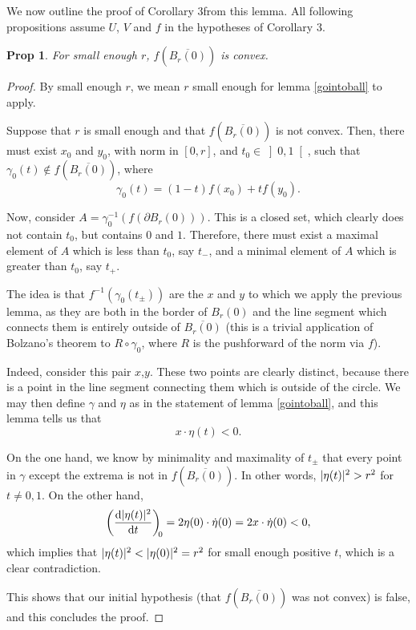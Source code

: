 \documentclass{article}
\newtheorem{prop}{Prop}
\theoremstyle{nonumberplain}
\newtheorem{proof}{Proof}
\DeclarePairedDelimiter{\norm}{\lvert}{\rvert}
\newcommand{\corthree}{Corollary 3}
\begin{document}
We now outline the proof of \corthree from this lemma. All following propositions assume $U$, $V$ and $f$ in the hypotheses of \corthree.

\begin{prop}
For small enough $r$, $f(\overline{B_r(0)})$ is convex.
\end{prop}

\begin{proof}
By small enough $r$, we mean $r$ small enough for lemma \ref{gointoball} to apply.

Suppose that $r$ is small enough and that $f(\overline{B_r(0)})$ is not convex. Then, there must exist $x_0$ and $y_0$, with norm in $[0,r]$, and $t_0 \in \left]0,1\right[$, such that $\gamma_0(t) \not \in f(\overline{B_r(0)})$, where
\[\gamma_0(t) = (1-t) f(x_0) + t f(y_0).\]

Now, consider $A = \gamma_0^{-1}(f(\partial B_r(0)))$. This is a closed set, which clearly does not contain $t_0$, but contains $0$ and $1$. Therefore, there must exist a maximal element of $A$ which is less than $t_0$, say $t_-$, and a minimal element of $A$ which is greater than $t_0$, say $t_+$.

The idea is that $f^{-1}(\gamma_0(t_\pm))$ are the $x$ and $y$ to which we apply the previous lemma, as they are both in the border of $B_r(0)$ and the line segment which connects them is entirely outside of $\overline{B_r(0)}$ (this is a trivial application of Bolzano's theorem to $R \circ \gamma_0$, where $R$ is the pushforward of the norm via $f$).

Indeed, consider this pair $x$,$y$. These two points are clearly distinct, because there is a point in the line segment connecting them which is outside of the circle. We may then define $\gamma$ and $\eta$ as in the statement of lemma \ref{gointoball}, and this lemma tells us that
\[x \cdot \eta(t) < 0.\]

On the one hand, we know by minimality and maximality of $t_\pm$ that every point in $\gamma$ except the extrema is not in $f(\overline{B_r(0)})$. In other words, $\norm{\eta(t)}^2 > r^2$ for $t \neq 0, 1$. On the other hand,
\[\diff{\norm{\eta(t)}^2}t[0] = 2 \eta(0) \cdot \dot\eta(0) = 2 x \cdot \dot\eta(0) < 0,\]
which implies that $\norm{\eta(t)}^2 < \norm{\eta(0)}^2 = r^2$ for small enough positive $t$, which is a clear contradiction.

This shows that our initial hypothesis (that $f(\overline{B_r(0)})$ was not convex) is false, and this concludes the proof.
\end{proof}
\end{document}

